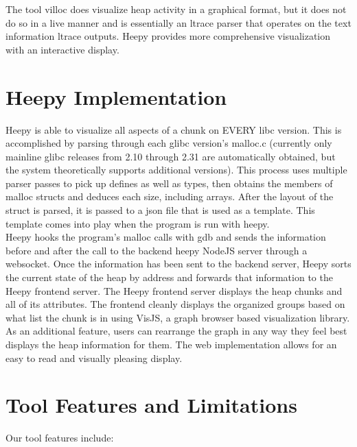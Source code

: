 \documentclass[12pt]{article}
\begin{document}
\hspace{\parindent} The tool villoc does visualize heap activity in a graphical format, but it does not do so in a live manner and is essentially an ltrace parser that operates on the text information ltrace outputs. Heepy provides more comprehensive visualization with an interactive display. \\

\section{Heepy Implementation}

\hspace{\parindent} Heepy is able to visualize all aspects of a chunk on EVERY libc version. This is accomplished by parsing through each glibc version’s malloc.c (currently only mainline glibc releases from 2.10 through 2.31 are automatically obtained, but the system theoretically supports additional versions). This process uses multiple parser passes to pick up defines as well as types, then obtains the members of malloc structs and deduces each size, including arrays. After the layout of the struct is parsed, it is passed to a json file that is used as a template. This template comes into play when the program is run with heepy. \\

\hspace{\parindent} Heepy hooks the program’s malloc calls with gdb and sends the information before and after the call to the backend heepy NodeJS server through a websocket. Once the information has been sent to the backend server, Heepy sorts the current state of the heap by address and forwards that information to the Heepy frontend server. The Heepy frontend server displays the heap chunks and all of its attributes. The frontend cleanly displays the organized groups based on what list the chunk is in using VisJS, a graph browser based visualization library. As an additional feature, users can rearrange the graph in any way they feel best displays the heap information for them. The web implementation allows for an easy to read and visually pleasing display. \\

\section{Tool Features and Limitations}

Our tool features include: \\
\end{document}
